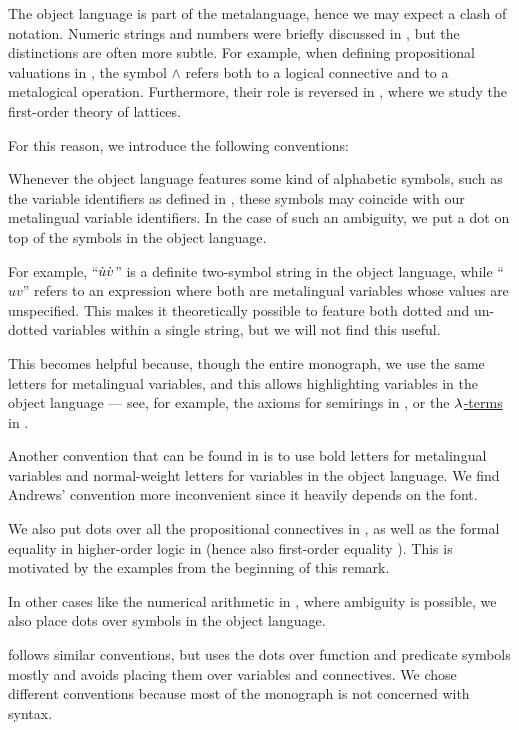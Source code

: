 \begin{remark}\label{rem:object_language_dots}
  The object language is part of the metalanguage, hence we may expect a clash of notation. Numeric strings and numbers were briefly discussed in , but the distinctions are often more subtle. For example, when defining propositional valuations in , the symbol \( \wedge \) refers both to a logical connective and to a metalogical operation. Furthermore, their role is reversed in , where we study the first-order theory of lattices.

  For this reason, we introduce the following conventions:
  \begin{thmenum}
     Whenever the object language features some kind of alphabetic symbols, such as the variable identifiers as defined in , these symbols may coincide with our metalingual variable identifiers. In the case of such an ambiguity, we put a dot on top of the symbols in the object language.

    For example, \enquote{\( \dot{u} \dot{v} \)} is a definite two-symbol string in the object language, while \enquote{\( uv \)} refers to an expression where both are metalingual variables whose values are unspecified. This makes it theoretically possible to feature both dotted and un-dotted variables within a single string, but we will not find this useful.

    This becomes helpful because, though the entire monograph, we use the same letters for metalingual variables, and this allows highlighting variables in the object language --- see, for example, the axioms for semirings in , or the \hyperref[def:lambda_term]{\( \mathrm{\lambda} \)-terms} in .

    Another convention that can be found in \cite[\S 51]{Andrews2002Logic} is to use bold letters for metalingual variables and normal-weight letters for variables in the object language. We find Andrews' convention more inconvenient since it heavily depends on the font.

     We also put dots over all the propositional connectives in , as well as the formal equality in higher-order logic in  (hence also first-order equality ). This is motivated by the examples from the beginning of this remark.

     In other cases like the numerical arithmetic in , where ambiguity is possible, we also place dots over symbols in the object language.
  \end{thmenum}

   follows similar conventions, but uses the dots over function and predicate symbols mostly and avoids placing them over variables and connectives. We chose different conventions because most of the monograph is not concerned with syntax.
\end{remark}
